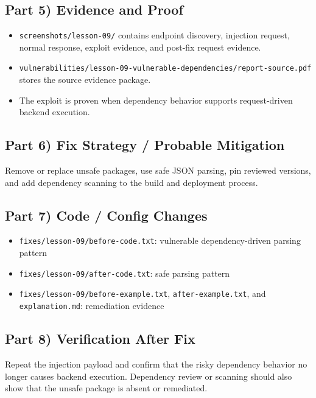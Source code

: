 \documentclass[12pt]{article}
\begin{document}
\subsection*{Part 5) Evidence and Proof}
\begin{itemize}
\item \texttt{screenshots/lesson-09/} contains endpoint discovery, injection request, normal response, exploit evidence, and post-fix request evidence.
\item \texttt{vulnerabilities/lesson-09-vulnerable-dependencies/report-source.pdf} stores the source evidence package.
\item The exploit is proven when dependency behavior supports request-driven backend execution.
\end{itemize}

\subsection*{Part 6) Fix Strategy / Probable Mitigation}
Remove or replace unsafe packages, use safe JSON parsing, pin reviewed versions, and add dependency scanning to the build and deployment process.

\subsection*{Part 7) Code / Config Changes}
\begin{itemize}
\item \texttt{fixes/lesson-09/before-code.txt}: vulnerable dependency-driven parsing pattern
\item \texttt{fixes/lesson-09/after-code.txt}: safe parsing pattern
\item \texttt{fixes/lesson-09/before-example.txt}, \texttt{after-example.txt}, and \texttt{explanation.md}: remediation evidence
\end{itemize}

\subsection*{Part 8) Verification After Fix}
Repeat the injection payload and confirm that the risky dependency behavior no longer causes backend execution. Dependency review or scanning should also show that the unsafe package is absent or remediated.
\end{document}
